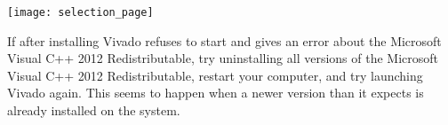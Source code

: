 \vspace{2mm}\noindent
\texttt{[image: selection\_page]}

\begin{mdframed}[style=note]
    If after installing Vivado refuses to start and gives an error about the Microsoft Visual
    C++ 2012 Redistributable, try uninstalling all versions of the Microsoft Visual C++ 2012
    Redistributable, restart your computer, and try launching Vivado again.
    This seems to happen when a newer version than it expects is already installed on the system.
\end{mdframed}
